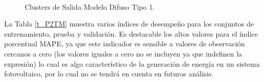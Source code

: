 \documentclass[12pt]{article}
\begin{document}
\begin{itemize}
\begin{figure}
		\centering
		\captionsetup{justification=centering}
		\\
		\caption{ Clusters de Salida Modelo Difuso Tipo 1.}
		\label{f_P2ClusterS}
\end{figure}


La Tabla \ref{t_P2TM} muestra varios índices de desempeño para los conjuntos de entrenamiento, prueba y validación. Es destacable los altos valores para el índice porcentual MAPE, ya que este indicador es sensible a valores de observación cercanos a cero (los valores iguales a cero no se incluyen ya que indefinen la expresión) lo cual es algo característico de la generación de energía en un sistema fotovoltaico, por lo cual no se tendrá en cuenta en futuros análisis.


\end{itemize}
\end{document}
